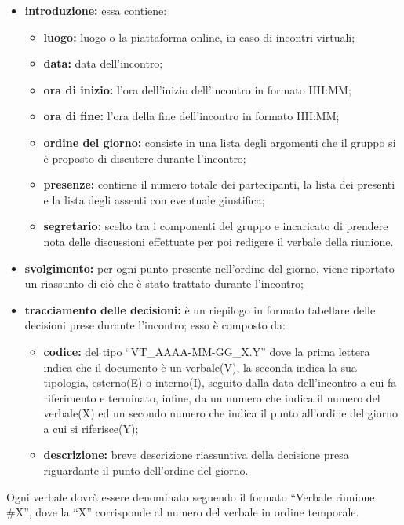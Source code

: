 					\begin{itemize}
						\item \textbf{introduzione:} essa contiene:
							\begin{itemize}
								\item \textbf{luogo:} luogo o la piattaforma online, in caso di incontri virtuali;
								\item \textbf{data:} data dell'incontro;
								\item \textbf{ora di inizio:} l'ora dell'inizio dell'incontro in formato HH:MM;
								\item \textbf{ora di fine:} l'ora della fine dell'incontro in formato HH:MM;
								\item \textbf{ordine del giorno:} consiste in una lista degli argomenti che il gruppo si è proposto di discutere durante l'incontro;
								\item \textbf{presenze:} contiene il numero totale dei partecipanti, la lista dei presenti e la lista degli assenti con eventuale giustifica;
								\item \textbf{segretario: } scelto tra i componenti del gruppo e incaricato di prendere nota delle discussioni effettuate per poi redigere il verbale della riunione.
							\end{itemize}
						\item \textbf{svolgimento:} per ogni punto presente nell'ordine del giorno, viene riportato un riassunto di ciò che è stato trattato durante l'incontro;
						\item \textbf{tracciamento delle decisioni:} è un riepilogo in formato tabellare delle decisioni prese durante l'incontro; esso è composto da:
							\begin{itemize}
								\item \textbf{codice:} del tipo ``VT\_AAAA-MM-GG\_X.Y'' dove la prima lettera indica che il documento è un verbale(V), la seconda indica la sua tipologia, esterno(E) o interno(I), seguito dalla data dell'incontro a cui fa riferimento e terminato, infine, da un numero che indica il numero del verbale(X) ed un secondo numero che indica il punto all'ordine del giorno a cui si riferisce(Y);
								\item \textbf{descrizione:} breve descrizione riassuntiva della decisione presa riguardante il punto dell'ordine del giorno.
							\end{itemize}
					\end{itemize}
					Ogni verbale dovrà essere denominato seguendo il formato ``Verbale riunione \#X'', dove la ``X'' corrisponde al numero del verbale in ordine temporale.
